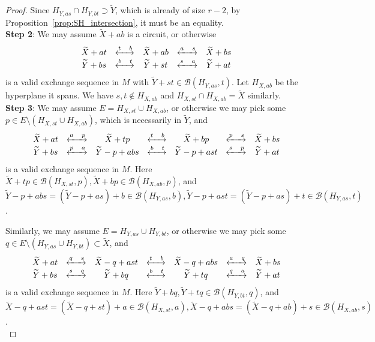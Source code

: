 \documentclass[10pt,a4paper]{amsart}
\newcommand\Bcal{{\mathcal B}}
\newcommand{\swap}[2]{\xleftrightarrow{#1 \quad #2}}
\begin{document}
\begin{proof}
    Since $H_{Y,as}\cap H_{Y,bt}\supset\widetilde{Y}$, which is already of size $r-2$, by Proposition~\ref{prop:SH_intersection}, it must be an equality.\\

    {\bf Step 2}: We may assume $\widetilde{X}+ab$ is a circuit, or otherwise
    $$
    \begin{array}{c c c c c}
        \widetilde{X}+at   & \swap{t}{b} & \widetilde{X}+ab & \swap{a}{s} & \widetilde{X}+bs\\
        \widetilde{Y}+bs   & \swap{b}{t} & \widetilde{Y}+st & \swap{s}{a} & \widetilde{Y}+at
    \end{array}
    $$
    is a valid exchange sequence in $M$ with $\widetilde{Y}+st\in\Bcal(H_{Y,as}, t)$. Let $H_{X,ab}$ be the hyperplane it spans. We have $s,t\not\in H_{X,ab}$ and $H_{X,st}\cap H_{X,ab}=\widetilde{X}$ similarly.\\

    {\bf Step 3}: We may assume $E=H_{X,st}\cup H_{X,ab}$, or otherwise we may pick some $p\in E\setminus (H_{X,st}\cup H_{X,ab})$, which is necessarily in $\widetilde{Y}$, and
    $$
    \begin{array}{c c c c c c c}
        \widetilde{X}+at   & \swap{a}{p} & \widetilde{X}+tp & \swap{t}{b} & \widetilde{X}+bp & \swap{p}{s} & \widetilde{X}+bs\\
        \widetilde{Y}+bs   & \swap{p}{a} & \widetilde{Y}-p+abs & \swap{b}{t} & \widetilde{Y}-p+ast & \swap{s}{p} & \widetilde{Y}+at
    \end{array}
    $$
    is a valid exchange sequence in $M$. Here $\widetilde{X}+tp\in\Bcal(H_{X,st},p), \widetilde{X}+bp\in\Bcal(H_{X,ab},p)$, and $\widetilde{Y}-p+abs=(\widetilde{Y}-p+as)+b\in\Bcal(H_{Y,as},b), \widetilde{Y}-p+ast=(\widetilde{Y}-p+as)+t\in\Bcal(H_{Y,as},t)$.

    Similarly, we may assume $E=H_{Y,as}\cup H_{Y,bt}$, or otherwise we may pick some $q\in E\setminus (H_{Y,as}\cup H_{Y,bt})\subset\widetilde{X}$, and
    $$
    \begin{array}{c c c c c c c}
        \widetilde{X}+at   & \swap{q}{s} & \widetilde{X}-q+ast & \swap{t}{b} & \widetilde{X}-q+abs & \swap{a}{q} & \widetilde{X}+bs\\
        \widetilde{Y}+bs   & \swap{s}{q} & \widetilde{Y}+bq & \swap{b}{t} & \widetilde{Y}+tq & \swap{q}{a} & \widetilde{Y}+at
    \end{array}
    $$
    is a valid exchange sequence in $M$. Here $\widetilde{Y}+bq, \widetilde{Y}+tq\in\Bcal(H_{Y,bt},q)$, and $\widetilde{X}-q+ast=(\widetilde{X}-q+st)+a\in\Bcal(H_{X,st},a), \widetilde{X}-q+abs=(\widetilde{X}-q+ab)+s\in\Bcal(H_{X,ab},s)$.\\


\end{proof}
\end{document}
